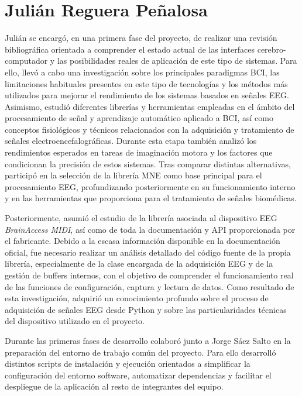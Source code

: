 \section*{Julián Reguera Peñalosa}
Julián se encargó, en una primera fase del proyecto, de realizar una revisión bibliográfica orientada a comprender el estado actual de las interfaces cerebro-computador y las posibilidades reales de aplicación de este tipo de sistemas. Para ello, llevó a cabo una investigación sobre los principales paradigmas BCI, las limitaciones habituales presentes en este tipo de tecnologías y los métodos más utilizados para mejorar el rendimiento de los sistemas basados en señales EEG. Asimismo, estudió diferentes librerías y herramientas empleadas en el ámbito del procesamiento de señal y aprendizaje automático aplicado a BCI, así como conceptos fisiológicos y técnicos relacionados con la adquisición y tratamiento de señales electroencefalográficas. Durante esta etapa también analizó los rendimientos esperados en tareas de imaginación motora y los factores que condicionan la precisión de estos sistemas. Tras comparar distintas alternativas, participó en la selección de la librería MNE como base principal para el procesamiento EEG, profundizando posteriormente en su funcionamiento interno y en las herramientas que proporciona para el tratamiento de señales biomédicas.

Posteriormente, asumió el estudio de la librería asociada al dispositivo EEG \textit{BrainAccess MIDI}, así como de toda la documentación y API proporcionada por el fabricante. Debido a la escasa información disponible en la documentación oficial, fue necesario realizar un análisis detallado del código fuente de la propia librería, especialmente de la clase encargada de la adquisición EEG y de la gestión de buffers internos, con el objetivo de comprender el funcionamiento real de las funciones de configuración, captura y lectura de datos. Como resultado de esta investigación, adquirió un conocimiento profundo sobre el proceso de adquisición de señales EEG desde Python y sobre las particularidades técnicas del dispositivo utilizado en el proyecto.

Durante las primeras fases de desarrollo colaboró junto a Jorge Sáez Salto en la preparación del entorno de trabajo común del proyecto. Para ello desarrolló distintos scripts de instalación y ejecución orientados a simplificar la configuración del entorno software, automatizar dependencias y facilitar el despliegue de la aplicación al resto de integrantes del equipo.

